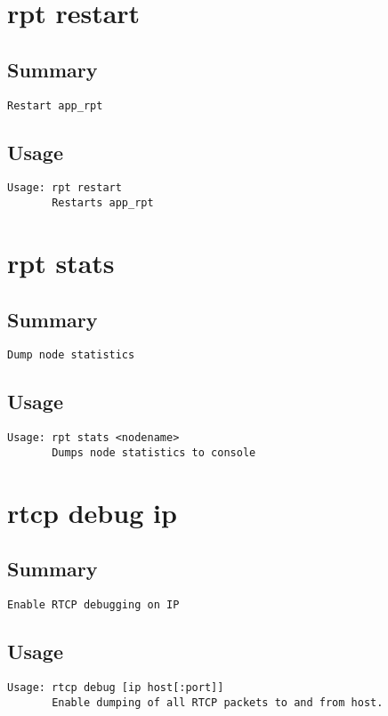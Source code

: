 \section{rpt restart}
\subsection{Summary}
\begin{verbatim}
Restart app_rpt
\end{verbatim}
\subsection{Usage}
\begin{verbatim}
Usage: rpt restart
       Restarts app_rpt

\end{verbatim}


\section{rpt stats}
\subsection{Summary}
\begin{verbatim}
Dump node statistics
\end{verbatim}
\subsection{Usage}
\begin{verbatim}
Usage: rpt stats <nodename>
       Dumps node statistics to console

\end{verbatim}


\section{rtcp debug ip}
\subsection{Summary}
\begin{verbatim}
Enable RTCP debugging on IP
\end{verbatim}
\subsection{Usage}
\begin{verbatim}
Usage: rtcp debug [ip host[:port]]
       Enable dumping of all RTCP packets to and from host.

\end{verbatim}


